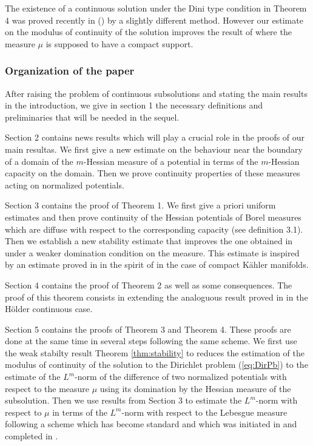 \documentclass[12pt]{amsart}
\theoremstyle{definition}
\numberwithin{theorem}{section}
\numberwithin{equation}{section}
\begin{document}
 The existence of a continuous solution under the Dini type condition in Theorem 4 was proved recently in (\cite{KN18}) by a slightly different method. However our  estimate on the modulus of continuity of the solution improves the result of  \cite{KN18}  where the measure $\mu$  is supposed to have a compact support.
   
 
 \subsubsection{Organization of the paper}
 
After raising the problem of continuous subsolutions and stating the main results in the introduction, we give in section 1  the necessary definitions and preliminaries that will be needed in the sequel. 

 \smallskip
 
Section 2 contains news results which will play a crucial role in the proofs of our main resultas. We first give a new estimate on the behaviour near the boundary of a domain of the $m$-Hessian measure of a potential in terms of the $m$-Hessian capacity on the domain. Then  we prove  continuity properties of these measures acting on normalized potentials.

 \smallskip
 
 Section 3 contains the proof of Theorem 1. We first give a priori uniform estimates and then prove continuity of the Hessian potentials of  Borel measures which are diffuse with respect to the corresponding capacity (see definition 3.1). Then we  establish a new stability estimate that improves the one obtained  in \cite{BZ20} under a weaker domination condition on the measure. This estimate is inspired by  an estimate proved  in \cite{BGZ08} in the spirit of \cite{EGZ09} in the case of compact K\"ahler manifolds.

 \smallskip
 
Section 4 contains the proof of Theorem 2 as well as some consequences.  The proof of this theorem  consists in extending the analoguous result proved in \cite{BZ20} in the H\"older continuous case.

 \smallskip
 
Section 5 contains the  proofs of Theorem 3 and Theorem 4. These proofs are done at the same time  in several steps following the same scheme.   We first use the weak stabilty result Theorem \ref{thm:stability} to reduces the estimation of the modulus of continuity of the solution to the Dirichlet problem  (\ref{eq:DirPb}) to the estimate of the $L^m$-norm of the difference of two normalized potentials with respect to the measure $\mu$ using its domination by  the Hessian measure of the subsolution. Then we use results from Section 3 to estimate the  $L^m$-norm with respect to $\mu$ in terms of the $L^m$-norm with respect to the Lebesgue measure following a scheme which has become standard and which was initiated in \cite{EGZ09} and completed in  \cite{GKZ08}.
\end{document}
